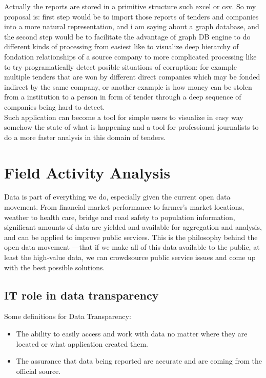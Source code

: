 \documentclass[12pt,a4paper,titlepage]{article}
\begin{document}
	Actually the reports are stored in a primitive structure such excel or csv. So my proposal is: first step would be to import those reports of tenders and companies into a more natural representation, and i am saying about a graph database, and the second step would be to facilitate the advantage of graph DB engine to do different kinds of processing from easiest like to visualize deep hierarchy of fondation relationships of a source company to more complicated processing like to try programatically detect posible situations of corruption: for example multiple tenders that are won by different direct companies which may be fonded indirect by the same company, or another example is how money can be stolen from a institution to a person in form of tender through a deep sequence of companies being hard to detect.\\
	
	Such application can become a tool for simple users to visualize in easy way somehow the state of what is happening and a tool for professional journalists to do a more faster analysis in this domain of tenders.\\
\cleardoublepage

\newpage
\section{Field Activity Analysis}

Data is part of everything we do, especially given the current open data movement. From financial market performance to farmer’s market locations, weather to health care, bridge and road safety to population information, significant amounts of data are yielded and available for aggregation and analysis, and can be applied to improve public services. This is the philosophy behind the open data movement —that if we make all of this data available to the public, at least the high-value data, we can crowdsource public service issues and come up with the best possible solutions. 

\subsection{IT role in data transparency}

Some definitions for Data Transparency:
\begin{itemize}
\item The ability to easily access and work with data no matter where they are located or what application created them.
\item The assurance that data being reported are accurate and are coming from the official source.
\end{itemize}
\end{document}

